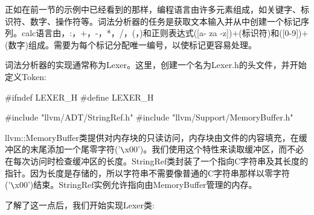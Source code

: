 正如在前一节的示例中已经看到的那样，编程语言由许多元素组成，如关键字、标识符、数字、操作符等。词法分析器的任务是获取文本输入并从中创建一个标记序列。calc语言由，:，+，-，*，/，(，)和正则表达式([a- za -z])+(标识符)和([0-9])+(数字)组成。需要为每个标记分配唯一编号，以使标记更容易处理。


词法分析器的实现通常称为Lexer。这里，创建一个名为Lexer.h的头文件，并开始定义Token:

\begin{cpp}
#ifndef LEXER_H
#define LEXER_H

#include "llvm/ADT/StringRef.h"
#include "llvm/Support/MemoryBuffer.h"
\end{cpp}

llvm::MemoryBuffer类提供对内存块的只读访问，内存块由文件的内容填充，在缓冲区的末尾添加一个尾零字符('\verb|\|x00')。我们使用这个特性来读取缓冲区，而不必在每次访问时检查缓冲区的长度。StringRef类封装了一个指向C字符串及其长度的指针。因为长度是存储的，所以字符串不需要像普通的C字符串那样以零字符('\verb|\|x00')结束。StringRef实例允许指向由MemoryBuffer管理的内存。

了解了这一点后，我们开始实现Lexer类:

